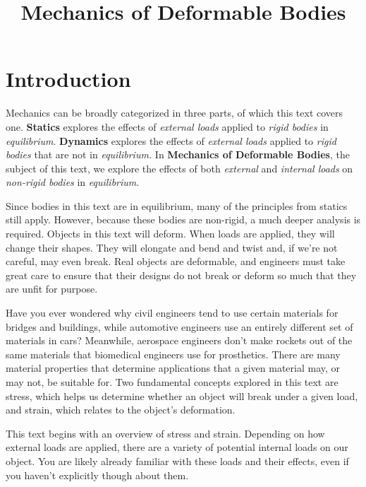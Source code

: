 \documentclass[
  letterpaper,
  DIV=11,
  numbers=noendperiod]{scrreprt}
\title{Mechanics of Deformable Bodies}
\author{}
\date{}
\renewcommand*\contentsname{Table of contents}
\newcommand\contentsname{Table of contents}
\begin{document}
\maketitle

\renewcommand*\contentsname{Table of contents}
{
\hypersetup{linkcolor=}
\setcounter{tocdepth}{2}
\tableofcontents
}

\chapter*{Introduction}\label{introduction}


Mechanics can be broadly categorized in three parts, of which this text
covers one. \textbf{Statics} explores the effects of \emph{external
loads} applied to \emph{rigid bodies} in \emph{equilibrium}.
\textbf{Dynamics} explores the effects of \emph{external loads} applied
to \emph{rigid bodies} that are not in \emph{equilibrium.} In
\textbf{Mechanics of Deformable Bodies}, the subject of this text, we
explore the effects of both \emph{external} and \emph{internal loads} on
\emph{non-rigid bodies} in \emph{equilibrium}.

Since bodies in this text are in equilibrium, many of the principles
from statics still apply. However, because these bodies are non-rigid, a
much deeper analysis is required. Objects in this text will deform. When
loads are applied, they will change their shapes. They will elongate and
bend and twist and, if we're not careful, may even break. Real objects
are deformable, and engineers must take great care to ensure that their
designs do not break or deform so much that they are unfit for purpose.

Have you ever wondered why civil engineers tend to use certain materials
for bridges and buildings, while automotive engineers use an entirely
different set of materials in cars? Meanwhile, aerospace engineers don't
make rockets out of the same materials that biomedical engineers use for
prosthetics. There are many material properties that determine
applications that a given material may, or may not, be suitable for. Two
fundamental concepts explored in this text are stress, which helps us
determine whether an object will break under a given load, and strain,
which relates to the object's deformation.

This text begins with an overview of stress and strain. Depending on how
external loads are applied, there are a variety of potential internal
loads on our object. You are likely already familiar with these loads
and their effects, even if you haven't explicitly though about them.
\end{document}
